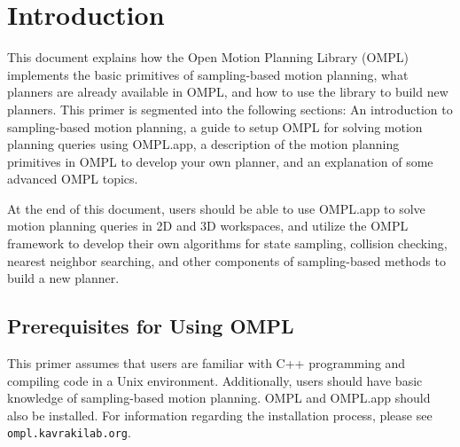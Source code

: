 \chapter{Introduction}

This document explains how the Open Motion Planning Library (OMPL) implements
the basic primitives of sampling-based motion planning, what planners are
already available in OMPL, and how to use the library to build new planners.
This primer is segmented into the following sections: An introduction to
sampling-based motion planning, a guide to setup OMPL for solving motion
planning queries using OMPL.app, a description of the motion planning
primitives in OMPL to develop your own planner, and an explanation of
some advanced OMPL topics.

At the end of this document, users should be able to use OMPL.app to solve
motion planning queries in 2D and 3D workspaces, and utilize the OMPL framework
to develop their own algorithms for state sampling, collision checking, nearest
neighbor searching, and other components of sampling-based methods to build
a new planner.


\section {Prerequisites for Using OMPL}
This primer assumes that users are familiar with C++ programming and compiling
code in a Unix environment.  Additionally, users should have basic knowledge of
sampling-based motion planning.  OMPL and OMPL.app should also be installed.
For information regarding the installation process, please see
{\tt ompl.kavrakilab.org}.

